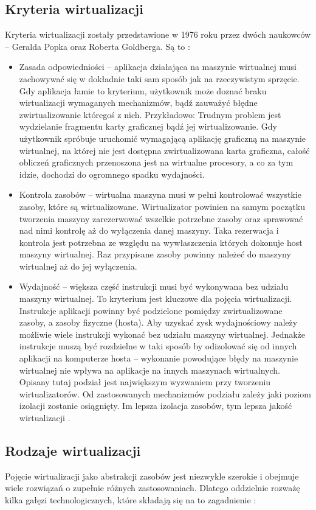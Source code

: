 \documentclass[10pt,a4paper,titlepage,twoside]{report}
\begin{document}
\subsection{Kryteria wirtualizacji}\indent \indent Kryteria wirtualizacji zostały przedstawione w 1976 roku przez dwóch naukowców – Geralda Popka oraz Roberta Goldberga. Są to \cite{ad15}:
\begin{itemize}
	\item Zasada odpowiedniości – aplikacja działająca na maszynie wirtualnej musi zachowywać się w dokładnie taki sam sposób jak na rzeczywistym sprzęcie.
Gdy aplikacja łamie to kryterium, użytkownik może doznać braku wirtualizacji wymaganych mechanizmów, bądź zauważyć błędne zwirtualizowanie któregoś z nich. Przykładowo: Trudnym problem jest wydzielanie fragmentu karty graficznej bądź jej wirtualizowanie. Gdy użytkownik spróbuje uruchomić wymagającą aplikację graficzną na maszynie wirtualnej, na której nie jest dostępna zwirtualizowana karta graficzna, całość obliczeń graficznych przenoszona jest na wirtualne procesory, a co za tym idzie, dochodzi do ogromnego spadku wydajności.
	\item Kontrola zasobów – wirtualna maszyna musi w pełni kontrolować wszystkie zasoby, które są wirtualizowane. Wirtualizator powinien na samym początku tworzenia maszyny zarezerwować wszelkie potrzebne zasoby oraz sprawować nad nimi kontrolę aż do wyłączenia danej maszyny. Taka rezerwacja i kontrola jest potrzebna ze względu na wywłaszczenia których dokonuje host maszyny wirtualnej. Raz przypisane zasoby powinny należeć do maszyny wirtualnej aż do jej wyłączenia.
	\item Wydajność – większa część instrukcji musi być wykonywana bez udziału maszyny wirtualnej.
To kryterium jest kluczowe dla pojęcia wirtualizacji. Instrukcje aplikacji powinny być podzielone pomiędzy zwirtualizowane zasoby, a zasoby fizyczne (hosta). Aby uzyskać zysk wydajnościowy należy możliwie wiele instrukcji wykonać bez udziału maszyny wirtualnej. Jednakże instrukcje muszą być rozdzielne w taki sposób by odizolować się od innych aplikacji na komputerze hosta – wykonanie powodujące błędy na maszynie wirtualnej nie wpływa na aplikacje na innych maszynach wirtualnych. Opisany tutaj podział jest największym wyzwaniem przy tworzeniu wirtualizatorów. Od zastosowanych mechanizmów podziału zależy jaki poziom izolacji zostanie osiągnięty. Im lepsza izolacja zasobów, tym lepsza jakość wirtualizacji \cite{ad17}.
\end{itemize}

\subsection{Rodzaje wirtualizacji}\indent \indent Pojęcie wirtualizacji jako abstrakcji zasobów jest niezwykle szerokie i obejmuje wiele rozwiązań o zupełnie różnych zastosowaniach. Dlatego oddzielnie rozważę kilka gałęzi technologicznych, które składają się na to zagadnienie \cite{ad15}\cite{ad18}:
\end{document}

